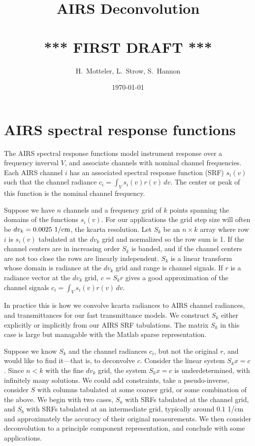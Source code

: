 \documentclass[11pt]{article}
\title{AIRS Deconvolution \\ 
\\
{***} FIRST DRAFT {***}}
\author{H.~Motteler, L.~Strow, S.~Hannon}
\date{\today}
\begin{document}
\maketitle
\section{AIRS spectral response functions}

The AIRS spectral response functions model instrument response over
a frequency inverval $V$, and associate channels with nominal channel
frequencies.  Each AIRS channel $i$ has an associated spectral
response function (SRF) $s_i(v)$ such that the channel radiance $c_i
= \int_V s_i(v)r(v)\,dv$.  The center or peak of this function is
the nominal channel frequency.

Suppose we have $n$ channels and a frequency grid of $k$ points
spanning the domains of the functions $s_i(v)$.  For our
applications the grid step size will often be $dv_k =
0.0025\ 1/\hbox{cm}$, the kcarta resolution.  Let $S_k$ be an
$n\times k$ array where row $i$ is $s_i(v)$ tabulated at the $dv_k$
grid and normalized so the row sum is 1.  If the channel centers are
in increasing order $S_k$ is banded, and if the channel centers are
not too close the rows are linearly independent.  $S_k$ is a linear
transform whose domain is radiance at the $dv_k$ grid and range is
channel signals.  If $r$ is a radiance vector at the $dv_k$ grid, $c
= S_k r$ gives a good approximation of the channel signals $c_i =
\int_V s_i(v)r(v)\,dv$.

In practice this is how we convolve kcarta radiances to AIRS 
channel radiances, and transmittances for our fast transmittance
models.  We construct $S_k$ either explicitly or implicitly from 
our AIRS SRF tabulations.  The matrix $S_k$ in this case is large
but managable with the Matlab sparse representation.

Suppose we know $S_k$ and the channel radiances $c_i$, but not the
original $r$, and would like to find it---that is, to deconvolve
$c$.  Consider the linear system $S_k x = c$.  Since $n < k$ with
the fine $dv_k$ grid, the system $S_k x = c$ is underdetermined,
with infinitely many solutions.  We could add constraints, take a
pseudo-inverse, consider $S$ with columns tabulated at some coarser
grid, or some combination of the above.  We begin with two cases,
$S_a$ with SRFs tabulated at the channel grid, and $S_b$ with SRFs
tabulated at an intermediate grid, typically around $0.1$ 1/cm and
approximately the accuracy of their original measurements.  We then
consider deconvolution to a principle component representation, and
conclude with some applications.
\end{document}
